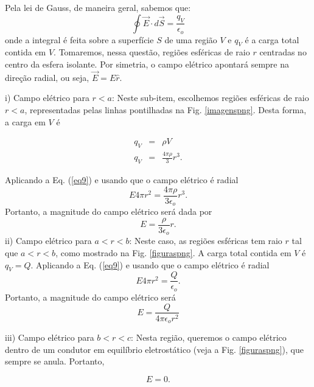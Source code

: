 \begin{enumerate}[start=1,label={\bfseries Q\arabic*.}]
\resposta Pela lei de Gauss, de maneira geral, sabemos que:
%
\begin{equation} \label{eq9}
  \oint \vec{E} \cdot d \vec{S} = \frac{q_{V}}{\epsilon_{o}}
\end{equation}
%
onde a integral é feita sobre a superfície $S$ de uma região $V$ e $q_{V}$ é a carga total contida em $V$. Tomaremos, nessa questão, regiões esféricas de raio $r$ centradas no centro da esfera isolante. Por simetria, o campo elétrico apontará sempre na direção radial, ou seja, $\vec{E} = E \hat{r}$.

i) Campo elétrico para $r < a$: Neste sub-item, escolhemos regiões esféricas de raio $r < a$, representadas pelas linhas pontilhadas na Fig. \ref{imagenspng}. Desta forma, a carga em $V$ é
%

\begin{equation}
  \begin{array}{ccc}
    q_{V} & = & \rho V \\
    q_{V} & = & \frac{4 \pi \rho}{3} r^{3} .
  \end{array}
\end{equation}
%

Aplicando a Eq. (\ref{eq9}) e usando que o campo elétrico é radial
\begin{equation}
  E 4 \pi r^{2} = \frac{4 \pi \rho}{3 \epsilon_{o}} r^{3} .
\end{equation}
%
Portanto, a magnitude do campo elétrico será dada por
%
\begin{equation}
  E = \frac{\rho}{3 \epsilon_{o}} r .
\end{equation}
%
ii) Campo elétrico para $a < r < b$: Neste caso, as regiões esféricas tem raio $r$ tal que $a < r < b$, como mostrado na Fig. \ref{figuraspng}. A carga total contida em $V$ é $q_{V} = Q$. Aplicando a Eq. (\ref{eq9}) e usando que o campo elétrico é radial
%
\begin{equation}
  E 4 \pi r^{2} = \frac{Q}{\epsilon_{o}} .
\end{equation}
%
Portanto, a magnitude do campo elétrico será
%
\begin{equation}
  E = \frac{Q}{4 \pi \epsilon_{o} r^{2}}
\end{equation}
%

iii) Campo elétrico para $b < r < c$: Nesta região, queremos o campo elétrico dentro de um condutor em equilíbrio eletrostático (veja a Fig. \ref{figuraspng}), que sempre se anula. Portanto,
%

$$
E = 0 .
$$
%


\end{enumerate}
